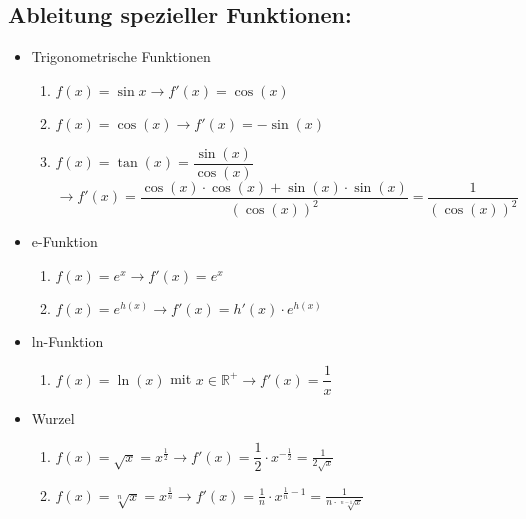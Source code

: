 \documentclass[a4paper,twocolumn,10pt]{onepgnote1}
\begin{document}
\subsection{Ableitung spezieller Funktionen:}
\begin{itemize}
\item Trigonometrische Funktionen\\
\begin{enumerate} \item $f(x)= \sin{x} \longrightarrow f'(x) = \cos(x)$\\
\item $f(x)= \cos(x) \longrightarrow f'(x) = -\sin(x)$\\
\item $f(x) = \tan(x)= \dfrac{\sin(x)}{\cos(x)}$ \\$ \longrightarrow f'(x) = \dfrac{\cos(x) \cdot \cos(x) + \sin(x) \cdot \sin(x)}{(\cos(x))^2} = \dfrac{1}{(\cos(x))^2}$
\end{enumerate}
\item e-Funktion\\ \begin{enumerate} \item $f(x) = e^x \longrightarrow f'(x) = e^x$ \\ \item $f(x) = e^{h(x) } \longrightarrow f'(x) = h'(x) \cdot e^{h(x)}$\end{enumerate}
\item ln-Funktion\\ \begin{enumerate} \item $f(x) = \ln(x)$ mit $x\in \mathds{R}^+ \longrightarrow f'(x) = \dfrac{1}{x}$ \end{enumerate}
\item Wurzel\\ \begin{enumerate}\item $f(x) = \sqrt{x} = x^{\frac{1}{2}} \longrightarrow f'(x) = \dfrac{1}{2} \cdot x^{-\frac{1}{2}} = \frac{1}{2\sqrt{x}}$\\ \item $f(x)= \sqrt[n]{x} = x^{\frac{1}{n}} \longrightarrow f'(x) = \frac{1}{n} \cdot x^{\frac{1}{n} -1} = \frac{1}{n\cdot \sqrt[{n-1}]{x}}$\end{enumerate}
\end{itemize}
\end{document}
